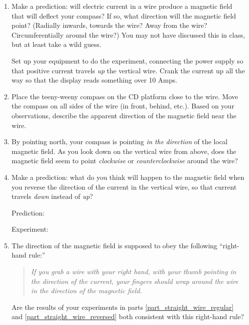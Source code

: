 \begin{enumerate}[labparts]

\item Make a prediction: will electric current in a wire produce a magnetic field that will deflect your compass?  If so, what direction will the magnetic field point?  (Radially inwards, towards the wire?  Away from the wire?  Circumferentially around the wire?)  You may not have discussed this in class, but at least take a wild guess.
\answerspace{0.5 in}

Set up your equipment to do the experiment, connecting the power supply so that positive current travels \textit{up} the vertical wire.  Crank the current up all the way so that the display reads something over 10 Amps.  

\item Place the teeny-weeny compass on the CD platform close to the wire.  Move the compass on all sides of the wire (in front, behind, etc.).  Based on your observations, describe the apparent direction of the magnetic field near the wire. \label{part_straight_wire_regular}
\answerspace{0.5 in}

\item By pointing north, your compass is pointing \textit{in the direction} of the local magnetic field.  As you look down on the vertical wire from above, does the magnetic field seem to point \textit{clockwise} or \textit{counterclockwise} around the wire? 
\answerspace{0.3 in}

\item Make a prediction: what do you think will happen to the magnetic field when you reverse the direction of the current in the vertical wire, so that current travels \textit{down} instead of \textit{up}? \label{part_straight_wire_reversed}

\bigskip
\hspace{0.5in} Prediction:

\bigskip
\hspace{0.5in} Experiment:
\bigskip

\item The direction of the magnetic field is supposed to obey the following ``right-hand rule:''
\begin{quote}\textit{If you grab a wire with your right hand, with your thumb pointing in the direction of the current, your fingers should wrap around the wire in the direction of the magnetic field.}
\end{quote}
Are the results of your experiments in parts \ref{part_straight_wire_regular} and \ref{part_straight_wire_reversed} both consistent with this right-hand rule?
\answerspace{0.3 in}

\end{enumerate}

